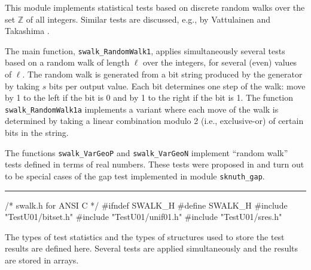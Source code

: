 
This module implements statistical tests based on discrete random walks
 over the set $\mathbb{Z}$ of all integers.
Similar tests are discussed, e.g., by 
Vattulainen \cite{rVAT94a,rVAT95a} and Takashima \cite{rTAK96a}.

The main function, {\tt swalk\_RandomWalk1}, applies simultaneously
several tests based on a random walk of length $\ell$ over the 
integers, for several (even) values of $\ell$.
The random walk is generated from a bit string produced by the 
generator by taking $s$ bits per output value.
Each bit determines one step of the walk: move by 1 to the left
if the bit is 0 and by 1 to the right if the bit is 1.
The function {\tt swalk\_RandomWalk1a} implements a variant
where each move of the walk is determined by taking a linear
combination modulo 2 (i.e., exclusive-or) of certain bits in the string.

The functions {\tt swalk\_VarGeoP} and {\tt swalk\_VarGeoN} implement
``random walk'' tests defined in terms of real numbers.
These tests were proposed in \cite{rSHC97a} and turn out to be special
cases of the gap test implemented in module {\tt sknuth\_gap}.

\resdef

\bigskip\hrule

\code\hide
/* swalk.h  for ANSI C */
#ifndef SWALK_H
#define SWALK_H
\endhide
#include "TestU01/bitset.h"
#include "TestU01/unif01.h"
#include "TestU01/sres.h"
\endcode


\ifdetailed   %



The types of test statistics and the types of structures 
used to store the test results are defined here.
Several tests are applied simultaneously and the results are stored
in arrays.


\code

